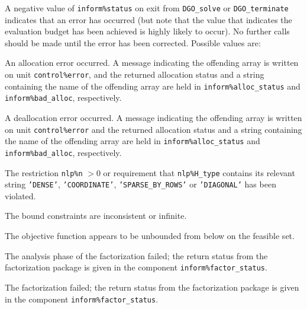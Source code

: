 \documentclass{galahad}
\newcommand{\packagename}{DGO}
\begin{document}

\galerrors
A negative value of {\tt inform\%status} on exit from
{\tt \packagename\_solve}
or
{\tt \packagename\_terminate}
indicates that an error has occurred (but note that the
value {\tt \galbudgetexhausted} that indicates the evaluation 
budget has been achieved is highly likely to occur).
No further calls should be made
until the error has been corrected. Possible values are:

\begin{description}

 An allocation error occurred.
A message indicating the offending
array is written on unit {\tt control\%error}, and the returned allocation
status and a string containing the name of the offending array
are held in {\tt inform\%alloc\_\-status}
and {\tt inform\%bad\_alloc}, respectively.

 A deallocation error occurred.
A message indicating the offending
array is written on unit {\tt control\%error} and the returned allocation
status and a string containing the name of the offending array
are held in {\tt inform\%alloc\_\-status}
and {\tt inform\%bad\_alloc}, respectively.

  The restriction {\tt nlp\%n} $> 0$
  or requirement that {\tt nlp\%H\_type} contains its relevant string
  {\tt 'DENSE'}, {\tt 'COORDINATE'}, {\tt 'SPARSE\_BY\_ROWS'}
  or {\tt 'DIAGONAL'}
  has been violated.


 The bound constraints are inconsistent or infinite.

  The objective function appears to be unbounded
 from below on the feasible set.

 The analysis phase of the factorization failed;
 the return status from the factorization
    package is given in the component {\tt inform\%fac\-t\-or\_status}.

 The factorization failed;
 the return status from the factorization
    package is given in the component {\tt inform\%fac\-t\-or\_status}.


\end{description}
\end{document}
